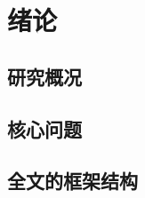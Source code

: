 \chapter{绪论}
\section{研究概况}

\zhlipsum[2-3]

\section{核心问题}

\zhlipsum[2-3]

\section{全文的框架结构}

\zhlipsum[2-3]